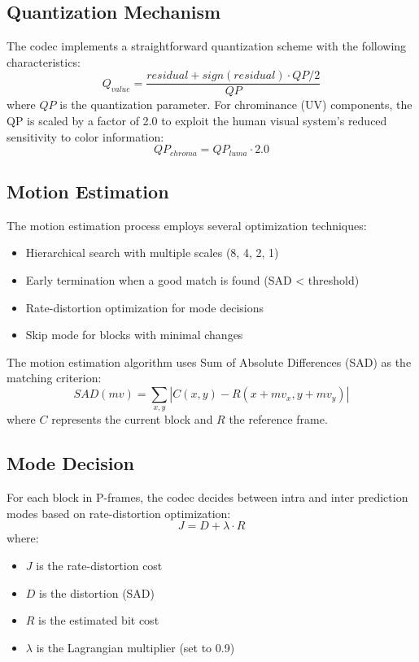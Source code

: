 \documentclass[a4paper,14pt]{article}
\begin{document}
\subsection{Quantization Mechanism}
The codec implements a straightforward quantization scheme with the following characteristics:
\begin{equation}
Q_{value} = \frac{residual + sign(residual) \cdot QP/2}{QP}
\end{equation}
where $QP$ is the quantization parameter. For chrominance (UV) components, the QP is scaled by a factor of 2.0 to exploit the human visual system's reduced sensitivity to color information:
\begin{equation}
QP_{chroma} = QP_{luma} \cdot 2.0
\end{equation}
\subsection{Motion Estimation}
The motion estimation process employs several optimization techniques:
\begin{itemize}
\item Hierarchical search with multiple scales (8, 4, 2, 1)
\item Early termination when a good match is found (SAD < threshold)
\item Rate-distortion optimization for mode decisions
\item Skip mode for blocks with minimal changes
\end{itemize}
The motion estimation algorithm uses Sum of Absolute Differences (SAD) as the matching criterion:
\begin{equation}
SAD(mv) = \sum_{x,y} |C(x,y) - R(x+mv_x,y+mv_y)|
\end{equation}
where $C$ represents the current block and $R$ the reference frame.
\subsection{Mode Decision}
For each block in P-frames, the codec decides between intra and inter prediction modes based on rate-distortion optimization:
\begin{equation}
J = D + \lambda \cdot R
\end{equation}
where:
\begin{itemize}
\item $J$ is the rate-distortion cost
\item $D$ is the distortion (SAD)
\item $R$ is the estimated bit cost
\item $\lambda$ is the Lagrangian multiplier (set to 0.9)
\end{itemize}
\end{document}
